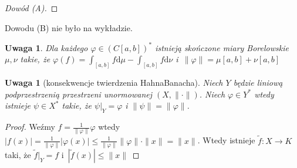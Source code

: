 \documentclass[11pt]{mwrep}
\renewcommand{\[}{\begin{equation}}
\renewcommand{\]}{\end{equation}}
\newcommand{\dd}{\mathrm{d}}
\newcommand{\norm}{\|\cdot\|}
\newtheorem{uwaga}[subsection]{Uwaga}
\begin{document}
\begin{proof}[Dowód (A)]
%
\end{proof}
Dowodu (B) nie było na wykładzie.
\begin{uwaga}
	Dla każdego $\varphi\in (C[a,b])^*$ istnieją skończone miary Borelowskie $\mu, \nu$ takie, że 
	$\varphi(f) = \int_{[a,b]} f \dd\mu - \int_{[a,b]} f \dd \nu$ i~$\|\varphi\| = \mu[a,b]+ \nu[a,b]$
\end{uwaga}
\begin{uwaga}[konsekwencje twierdzenia Hahna\dywiz Banacha]
	Niech $Y$ będzie liniową podprzestrzenią przestrzeni unormowanej $(X,\norm)$.
	Niech $\varphi\in Y^*$ wtedy istnieje $\psi \in X^*$ takie, że $\psi|_Y = \varphi$ i $\|\psi\| = \|\varphi\|$.
	
\end{uwaga}
\begin{proof}
Weźmy $f= \frac{1}{\|\varphi\|} \varphi$ wtedy 
$|f(x)| = \frac{1}{\|\varphi\|}|\varphi(x)| \le \frac{1}{\|\varphi\|}\|\varphi\|\cdot \|x\| = \|x\|$.
Wtedy istnieje $\tilde{f} \colon X \to K$ taki, że $\tilde{f}|_Y = f$ i~$ |\tilde{f}(x) | \le \|x\| $
\end{proof}
\end{document}
